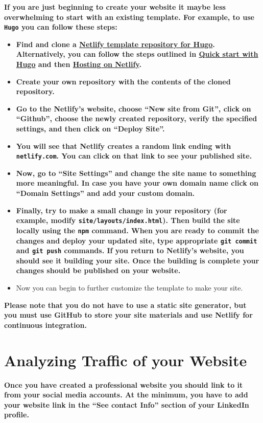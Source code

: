 \documentclass[11pt]{article}
\begin{document}
\textbf{If you are just beginning to create your website it maybe less overwhelming to start with an existing template. For example, to use {\tt Hugo} you can follow these steps:}
\begin{itemize}
	\item \textbf{Find and clone a \href{https://github.com/netlify-templates/victor-hugo}{Netlify template repository for Hugo}. Alternatively, you can follow the steps outlined in \href{https://gohugo.io/getting-started/quick-start/}{Quick start with Hugo} and then \href{https://gohugo.io/hosting-and-deployment/hosting-on-netlify/}{Hosting on Netlify}.} 
	\item \textbf{Create your own repository with the contents of the cloned repository. }
	\item \textbf{Go to the Netlify's website, choose ``New site from Git'', click on ``Github'', choose the newly created repository, verify the specified settings, and then click on ``Deploy Site''.}
	\item \textbf{You will see that Netlify creates a random link ending with {\tt netlify.com}. You can click on that link to see your published site.}
	\item \textbf{Now, go to ``Site Settings'' and change the site name to something more meaningful. In case you have your own domain name click on ``Domain Settings'' and add your custom domain.}
	\item \textbf{Finally, try to make a small change in your repository (for example, modify {\tt site/layouts/index.html}). Then build the site locally using the {\tt npm} command. When you are ready to commit the changes and deploy your updated site, type appropriate {\tt git commit} and {\tt git push} commands. If you return to Netlify's website, you should see it building your site. Once the building is complete your changes should be published on your website.}
	\item Now you can begin to further customize the template to make your site.
\end{itemize}

\textbf{Please note that you do not have to use a static site generator, but you must use GitHub to store your site materials and use Netlify for continuous integration.}

\vspace{-0.05in}
\section*{Analyzing Traffic of your Website}
\textbf{Once you have created a professional website you should link to it from your social media accounts. At the minimum, you have to add your website link in the ``See contact Info'' section of your LinkedIn profile.}
\end{document}
